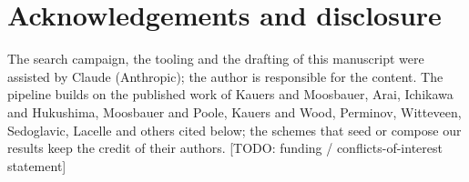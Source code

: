 \documentclass[11pt]{article}
\newcommand{\todo}[1]{{\color{red}[TODO: #1]}}
\theoremstyle{plain}
\theoremstyle{definition}
\begin{document}
\section*{Acknowledgements and disclosure}
The search campaign, the tooling and the drafting of this manuscript were assisted by Claude
(Anthropic); the author is responsible for the content.
The pipeline builds on the published work of Kauers and Moosbauer, Arai, Ichikawa and Hukushima,
Moosbauer and Poole, Kauers and Wood, Perminov, Witteveen, Sedoglavic, Lacelle and others cited
below; the schemes that seed or compose our results keep the credit of their authors.
\todo{funding / conflicts-of-interest statement}



\end{document}
